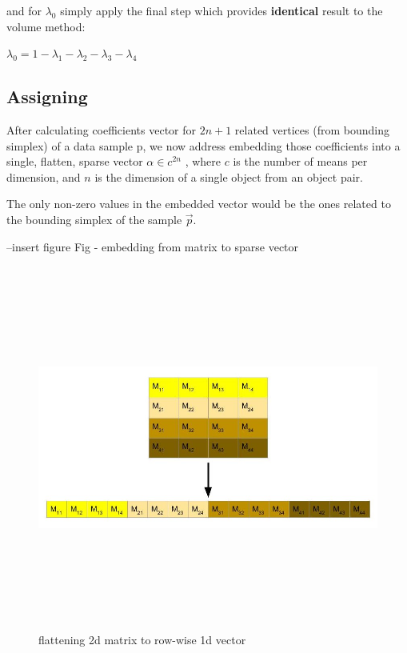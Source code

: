		
		and for $\lambda_0$ simply apply the final step which provides \textbf{identical} result to the volume method:
		
		$\lambda_0 = 1 - \lambda_1 - \lambda_2 - \lambda_3 - \lambda_4$ \\
		
	\subsection{Assigning}
	
	After calculating coefficients vector for $2n+1$ related vertices (from bounding simplex) of a data sample p, we now address embedding those coefficients into a single, flatten, sparse vector $\alpha \in c^{2n}$ , where $c$ is the number of means per dimension, and $n$ is the dimension of a single object from an object pair.
	
	The only non-zero values in the embedded vector would be the ones related to the bounding simplex of the sample $\overrightarrow{p}$.
	
	
	
	
	--insert figure Fig - embedding from matrix to sparse vector
	
	
	\begin{figure}[h] 	
		\includegraphics[width=\linewidth,height=12cm,keepaspectratio]{Figures/flatten}
		\caption[flattening 2d matrix]
		{flattening 2d matrix to row-wise 1d vector}
	\label{fig:33}	
	\end{figure}
			
